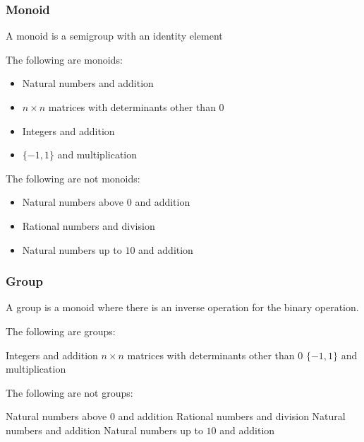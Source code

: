 \subsubsection{Monoid}

A monoid is a semigroup with an identity element

The following are monoids:

\begin{itemize}
\item Natural numbers and addition
\item \(n\times n\) matrices with determinants other than \(0\)
\item Integers and addition
\item \(\{-1, 1\}\) and multiplication
\end{itemize}

The following are not monoids:

\begin{itemize}
\item Natural numbers above \(0\) and addition
\item Rational numbers and division
\item Natural numbers up to \(10\) and addition
\end{itemize}

\subsubsection{Group}

A group is a monoid where there is an inverse operation for the binary operation.

The following are groups:

\begin{itemize}
\list Integers and addition
\list \(n\times n\) matrices with determinants other than \(0\)
\list \(\{-1, 1\}\) and multiplication
\end{itemize}

The following are not groups:

\begin{itemize}
\list Natural numbers above \(0\) and addition
\list Rational numbers and division
\list Natural numbers and addition
\list Natural numbers up to \(10\) and addition
\end{itemize}

